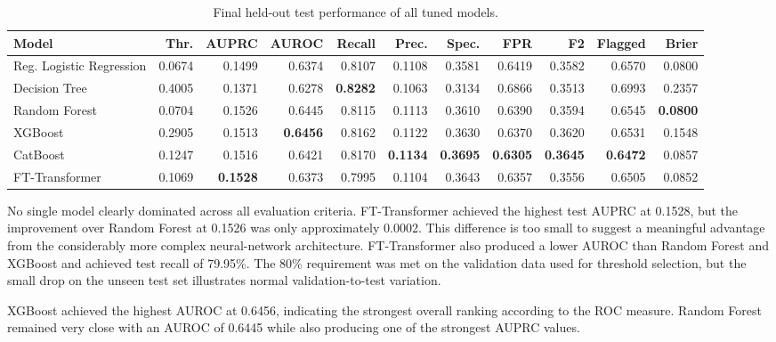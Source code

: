 \documentclass[11pt,a4paper]{article}
\begin{document}
\begin{table}[htbp]
\centering
\caption{Final held-out test performance of all tuned models.}
\label{tab:test_results}
\begin{adjustbox}{max width=\textwidth}
\begin{tabular}{lrrrrrrrrrr}
\toprule
Model & Thr. & AUPRC & AUROC & Recall & Prec. & Spec. & FPR & F2 & Flagged & Brier \\
\midrule
Reg. Logistic Regression & 0.0674 & 0.1499 & 0.6374 & 0.8107 & 0.1108 & 0.3581 & 0.6419 & 0.3582 & 0.6570 & 0.0800 \\
Decision Tree             & 0.4005 & 0.1371 & 0.6278 & \textbf{0.8282} & 0.1063 & 0.3134 & 0.6866 & 0.3513 & 0.6993 & 0.2357 \\
Random Forest             & 0.0704 & 0.1526 & 0.6445 & 0.8115 & 0.1113 & 0.3610 & 0.6390 & 0.3594 & 0.6545 & \textbf{0.0800} \\
XGBoost                   & 0.2905 & 0.1513 & \textbf{0.6456} & 0.8162 & 0.1122 & 0.3630 & 0.6370 & 0.3620 & 0.6531 & 0.1548 \\
CatBoost                  & 0.1247 & 0.1516 & 0.6421 & 0.8170 & \textbf{0.1134} & \textbf{0.3695} & \textbf{0.6305} & \textbf{0.3645} & \textbf{0.6472} & 0.0857 \\
FT-Transformer            & 0.1069 & \textbf{0.1528} & 0.6373 & 0.7995 & 0.1104 & 0.3643 & 0.6357 & 0.3556 & 0.6505 & 0.0852 \\
\bottomrule
\end{tabular}
\end{adjustbox}
\end{table}

No single model clearly dominated across all evaluation criteria. FT-Transformer achieved the highest test AUPRC at 0.1528, but the improvement over Random Forest at 0.1526 was only approximately 0.0002. This difference is too small to suggest a meaningful advantage from the considerably more complex neural-network architecture. FT-Transformer also produced a lower AUROC than Random Forest and XGBoost and achieved test recall of 79.95\%. The 80\% requirement was met on the validation data used for threshold selection, but the small drop on the unseen test set illustrates normal validation-to-test variation.

XGBoost achieved the highest AUROC at 0.6456, indicating the strongest overall ranking according to the ROC measure. Random Forest remained very close with an AUROC of 0.6445 while also producing one of the strongest AUPRC values.
\end{document}
